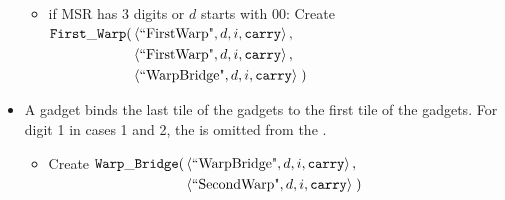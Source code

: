 \begin{itemize}
\begin{itemize}
                \item if MSR has 3 digits or $d$ starts with 00: Create
                $\begin{aligned}[t]
                    {\tt First\_Warp}(& \left\langle \text{``FirstWarp"}, d, i, {\tt carry} \right\rangle, \\
                               & \left\langle \text{``FirstWarp"}, d, i, {\tt carry} \right\rangle, \\
                               & \left\langle \text{``WarpBridge"}, d, i, {\tt carry} \right\rangle \;)
                \end{aligned}$

            \end{itemize}
            \vspace{.5cm}

            \item A {\warpbridge} gadget binds the last tile of the {\firstwarp} gadgets to the
            first tile of the {\secondwarp} gadgets. For digit 1 in cases 1 and 2, the
            {\warpbridge} is omitted from the {\warpunit}.

            \begin{itemize}
                \item Create
                $\begin{aligned}[t]
                    {\tt Warp\_Bridge}(& \left\langle \text{``WarpBridge"}, d, i, {\tt carry} \right\rangle, \\
                                & \left\langle \text{``SecondWarp"}, d, i, {\tt carry} \right\rangle \;)
                \end{aligned}$
                \vspace{.5cm}
            \end{itemize}


\end{itemize}
